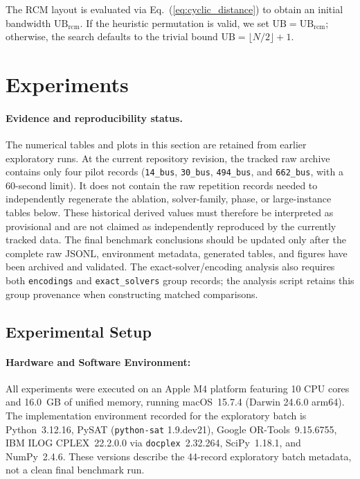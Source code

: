 \documentclass[a4paper,fleqn]{cas-sc}
\begin{document}
The RCM layout is evaluated via Eq.~(\ref{eq:cyclic_distance}) to obtain an initial bandwidth $\text{UB}_{\text{rcm}}$. If the heuristic permutation is valid, we set $\text{UB} = \text{UB}_{\text{rcm}}$; otherwise, the search defaults to the trivial bound $\text{UB} = \lfloor N/2 \rfloor + 1$.

\section{Experiments}

\paragraph{Evidence and reproducibility status.}
The numerical tables and plots in this section are retained from earlier exploratory
runs. At the current repository revision, the tracked raw archive contains only four
pilot records (\texttt{14\_bus}, \texttt{30\_bus}, \texttt{494\_bus}, and
\texttt{662\_bus}, with a 60-second limit). It does not contain the raw repetition
records needed to independently regenerate the ablation, solver-family, phase, or
large-instance tables below. These historical derived values must therefore be
interpreted as provisional and are not claimed as independently reproduced by the
currently tracked data. The final benchmark conclusions should be updated only after
the complete raw JSONL, environment metadata, generated tables, and figures have been
archived and validated. The exact-solver/encoding analysis also requires both
\texttt{encodings} and \texttt{exact\_solvers} group records; the analysis script
retains this group provenance when constructing matched comparisons.

\subsection{Experimental Setup}

\paragraph{Hardware and Software Environment:}
All experiments were executed on an Apple M4 platform featuring 10 CPU cores and 16.0~GB of unified memory, running macOS~15.7.4 (Darwin 24.6.0 arm64). The implementation environment recorded for the exploratory batch is Python~3.12.16, PySAT (\texttt{python-sat} 1.9.dev21), Google OR-Tools~9.15.6755, IBM ILOG CPLEX~22.2.0.0 via \texttt{docplex}~2.32.264, SciPy~1.18.1, and NumPy~2.4.6. These versions describe the 44-record exploratory batch metadata, not a clean final benchmark run.
\end{document}
